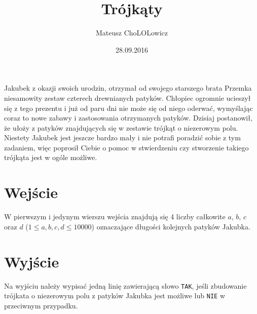 \documentclass[zad,zawodnik,utf8]{sinol}
\title{Trójkąty}
\author{Mateusz ChoLOLowicz} %
\date{28.09.2016}
\begin{document}
\begin{tasktext}%

Jakubek z okazji swoich urodzin, otrzymał od swojego starszego brata Przemka niesamowity zestaw czterech drewnianych patyków. Chłopiec ogromnie ucieszył się z tego prezentu i już od paru dni nie może się od niego oderwać, wymyślając coraz to nowe zabawy i zastosowania otrzymanych patyków. Dzisiaj postanowił, że ułoży z patyków znajdujących się w zestawie trójkąt o niezerowym polu. Niestety Jakubek jest jeszcze bardzo mały i nie potrafi poradzić sobie z tym zadaniem, więc poprosił Ciebie o pomoc w stwierdzeniu czy stworzenie takiego trójkąta jest w ogóle możliwe.


  \section{Wejście}
W pierwszym i jedynym wierszu wejścia znajdują się 4 liczby całkowite $a$, $b$, $c$ oraz $d$ ($1 \leq a, b, c, d \leq 10000$) oznaczające długości kolejnych patyków Jakubka. 

  \section{Wyjście}
Na wyjściu należy wypisać jedną linię zawierającą słowo \texttt{TAK}, jeśli zbudowanie trójkata o niezerowym polu z patyków Jakubka jest możliwe lub \texttt{NIE} w przeciwnym przypadku.
\makecompactexample 

\end{tasktext}
\end{document}
